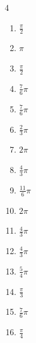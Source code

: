 \begin{multicols}{4}
\begin{enumerate}
  \item $\displaystyle \frac{\pi}{2}$

  \item $\displaystyle \pi$

  \item $\displaystyle \frac{\pi}{2}$

  \item $\displaystyle \frac{7}{6}\pi$

  \item $\displaystyle \frac{7}{6}\pi$

  \item $\displaystyle \frac{2}{3}\pi$

  \item $\displaystyle 2\pi$

  \item $\displaystyle \frac{4}{3}\pi$

  \item $\displaystyle \frac{11}{6}\pi$

  \item $\displaystyle 2\pi$

  \item $\displaystyle \frac{4}{3}\pi$

\columnbreak %

  \item $\displaystyle \frac{4}{3}\pi$

  \item $\displaystyle \frac{5}{4}\pi$

  \item $\displaystyle \frac{\pi}{3}$

  \item $\displaystyle \frac{7}{6}\pi$

  \item $\displaystyle \frac{\pi}{4}$


\end{enumerate}
\end{multicols}
